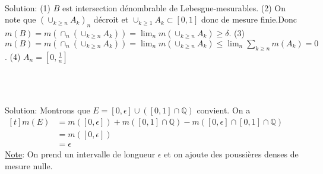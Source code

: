 \documentclass{report}
\begin{document}
\subsection{}  \\ \\

Solution: (1) $B$ est intersection dénombrable de Lebesgue-mesurables. \newline
(2) On note que $(\cup_{k\geq n} A_k)_n$ décroit et $\cup_{k\geq 1} A_k \subset [0,1]$ donc de mesure finie.\newline Donc $m(B) = m(\cap_n (\cup_{k\geq n} A_k))=\lim_n m(\cup_{k\geq n} A_k) \geq \delta$.\newline
(3) $m(B) = m(\cap_n (\cup_{k\geq n} A_k))=\lim_n m(\cup_{k\geq n} A_k)\leq \lim_n \sum_{k\geq n} m(A_k) = 0$.\newline
(4) $A_n = [0,\frac 1n]$ \\

\subsection{} \\\\

Solution: Montrons que $E=[0,\epsilon]  \cup \left( [0,1] \cap \mathbb Q\right)$ convient. \newline
On a $\begin{aligned}[t] m(E) &= m([0,\epsilon] ) + m([0,1] \cap \mathbb Q) - m([0,\epsilon]\cap [0,1] \cap \mathbb Q) \\ &= m([0,\epsilon])  \\ &= \epsilon    \end{aligned}$
\newline \newline
\underline{Note}: On prend un intervalle de longueur $\epsilon$ et on ajoute des poussières denses de mesure nulle.
\end{document}
